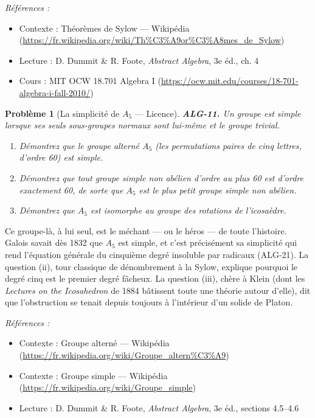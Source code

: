\documentclass[11pt]{article}
\newtheorem{problem}{Problème}
\newenvironment{refs}{\par\small\noindent\emph{Références :}\begin{itemize}\setlength\itemsep{0pt}}{\end{itemize}\normalsize}
\begin{document}
\begin{refs}
\item Contexte : Théorèmes de Sylow --- Wikipédia (\url{https://fr.wikipedia.org/wiki/Th%C3%A9or%C3%A8mes_de_Sylow})
\item Lecture : D. Dummit \& R. Foote, \textit{Abstract Algebra}, 3e éd., ch. 4
\item Cours : MIT OCW 18.701 Algebra I (\url{https://ocw.mit.edu/courses/18-701-algebra-i-fall-2010/})
\end{refs}

\bigskip

\begin{problem}[{La simplicité de $A_5$ --- Licence}]
\textbf{ALG-11.} Un groupe est \textit{simple} lorsque ses seuls sous-groupes normaux sont
lui-même et le groupe trivial.
\begin{enumerate}
\item[(i)] Démontrez que le groupe alterné $A_5$ (les permutations paires
de cinq lettres, d'ordre 60) est simple.
\item[(ii)] Démontrez que tout groupe simple non abélien d'ordre au
plus 60 est d'ordre exactement 60, de sorte que $A_5$ est le plus petit groupe simple non abélien.
\item[(iii)] Démontrez
que $A_5$ est isomorphe au groupe des rotations de l'icosaèdre.
\end{enumerate}

\end{problem}

\noindent Ce groupe-là, à lui seul, est le méchant --- ou le héros --- de toute l'histoire. Galois
savait dès 1832 que $A_5$ est simple, et c'est précisément sa simplicité qui rend l'équation générale du
cinquième degré insoluble par radicaux (ALG-21). La question (ii), tour classique de dénombrement à la Sylow,
explique pourquoi le degré cinq est le premier degré fâcheux. La question (iii), chère à Klein (dont les
\textit{Lectures on the Icosahedron} de 1884 bâtissent toute une théorie autour d'elle), dit que l'obstruction
se tenait depuis toujours à l'intérieur d'un solide de Platon.

\begin{refs}
\item Contexte : Groupe alterné --- Wikipédia (\url{https://fr.wikipedia.org/wiki/Groupe_altern%C3%A9})
\item Contexte : Groupe simple --- Wikipédia (\url{https://fr.wikipedia.org/wiki/Groupe_simple})
\item Lecture : D. Dummit \& R. Foote, \textit{Abstract Algebra}, 3e éd., sections 4.5--4.6
\end{refs}
\end{document}
